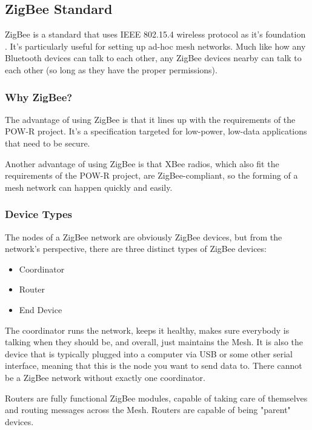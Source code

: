 
\subsection{ZigBee Standard}
ZigBee is a standard that uses \ac{IEEE} 802.15.4 wireless protocol as it's foundation \cite{Book:ZigBee}. It's 
particularly useful for setting up ad-hoc mesh networks. Much like how any Bluetooth
devices can talk to each other, any ZigBee devices nearby can talk to each other (so 
long as they have the proper permissions).

\subsubsection{Why ZigBee?}
The advantage of using ZigBee is that it lines up with the requirements of the \ac{POW-R}
project. It's a specification targeted for low-power, low-data applications that need
to be secure. 

Another advantage of using ZigBee is that XBee radios, which also fit the requirements
of the \ac{POW-R} project, are ZigBee-compliant, so the forming of a mesh network can happen
quickly and easily.

\subsubsection{Device Types}
The nodes of a ZigBee network are obviously ZigBee devices, but from the network's
perspective, there are three distinct types of ZigBee devices:

\begin{itemize}
	\item Coordinator
	\item Router
	\item End Device
\end{itemize}

The coordinator runs the network, keeps it healthy, makes sure everybody is talking when
they should be, and overall, just maintains the Mesh. It is also the device that is 
typically plugged into a computer via \ac{USB} or some other serial interface, meaning
that this is the node you want to send data to. There cannot be a ZigBee network
without exactly one coordinator.

Routers are fully functional ZigBee modules, capable of taking care of themselves and
routing messages across the Mesh. Routers are capable of being "parent" devices.

